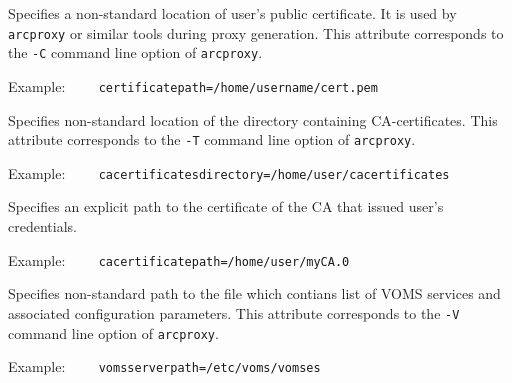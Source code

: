 Specifies a non-standard location of user's public certificate. It is used by
\texttt{arcproxy} or similar tools during proxy generation. This attribute
corresponds to the \verb#-C# command line option of \texttt{arcproxy}.

Example:
\verb#    certificatepath=/home/username/cert.pem#

{}
\hspace*{0.5cm}
\begin{shaded}
\end{shaded}

Specifies non-standard location of the directory containing CA-certificates.
This attribute
corresponds to the \verb#-T# command line option of \texttt{arcproxy}.

Example:
\verb#    cacertificatesdirectory=/home/user/cacertificates#

{}
\hspace*{0.5cm}
\begin{shaded}
\end{shaded}

Specifies an explicit path to the certificate of the CA that issued user's credentials.

Example:
\verb#    cacertificatepath=/home/user/myCA.0#

{}
\hspace*{0.5cm}
\begin{shaded}
\end{shaded}

Specifies non-standard path to the file which contians list of VOMS services and
associated configuration parameters. This attribute
corresponds to the \verb#-V# command line option of \texttt{arcproxy}.

Example:
\verb#    vomsserverpath=/etc/voms/vomses#

{}
\hspace*{0.5cm}
\begin{shaded}
\end{shaded}

